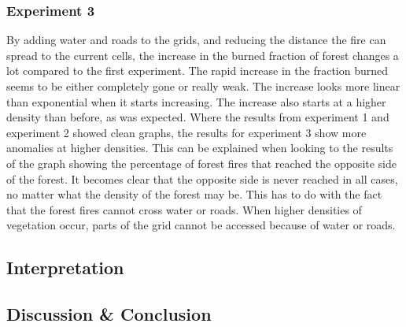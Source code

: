 \documentclass{article}
\begin{document}
\begin{multicols}{2}
\subsubsection*{Experiment 3}
By adding water and roads to the grids, and reducing the distance the fire can spread to the current cells, the increase in the burned fraction of forest changes a lot compared to the first experiment. The rapid increase in the fraction burned seems to be either completely gone or really weak. The increase looks more linear than exponential when it starts increasing. The increase also starts at a higher density than before, as was expected. Where the results from experiment 1 and experiment 2 showed clean graphs, the results for experiment 3 show more anomalies at higher densities. This can be explained when looking to the results of the graph showing the percentage of forest fires that reached the opposite side of the forest. It becomes clear that the opposite side is never reached in all cases, no matter what the density of the forest may be. This has to do with the fact that the forest fires cannot cross water or roads. When higher densities of vegetation occur, parts of the grid cannot be accessed because of water or roads.
\subsection*{Interpretation}

\subsection*{Discussion \& Conclusion}

\nocite{*}


\end{multicols}
\end{document}
